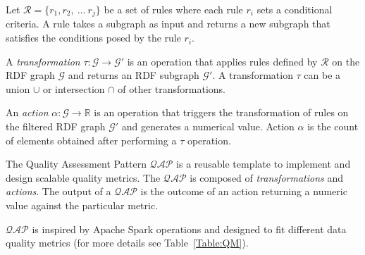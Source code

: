 \begin{definition}[Rule]
Let $\mathcal{R} = \{r_1,r_2,~\dots~r_j\}$ be a set of rules where each rule $r_i$ sets a conditional criteria. A rule takes a subgraph as input and returns a new subgraph that satisfies the conditions posed by the rule $r_i$.
\end{definition}

\begin{definition}[Transformation]
\label{def:tr}
A \textit{transformation} $\tau:\mathcal{G} \rightarrow \mathcal{G'}$ is an operation that applies rules defined by $\mathcal{R}$ on the RDF graph $\mathcal{G}$ and returns an RDF subgraph $\mathcal{G'}$. 
A transformation $\tau$ can be a union $\cup$ or intersection $\cap$ of other transformations. 
\end{definition}

\begin{definition}[Action]
\label{def:ac}
An \textit{action} $ \alpha: \mathcal{G}\rightarrow \mathbb{R}$ is an operation that triggers the transformation of rules on the filtered RDF graph $\mathcal{G'}$ and generates a numerical value. 
Action $\alpha$ is the count of elements obtained after performing a $\tau$ operation.
\end{definition}

\begin{definition}
\label{def:QAP}
The Quality Assessment Pattern $\mathcal{QAP}$ is a reusable template to implement and design scalable quality metrics. %
The $\mathcal{QAP}$ is composed of \textit{transformations} and \textit{actions}. 
The output of a $\mathcal{QAP}$ is the outcome of an action returning a numeric value against the particular metric.
\end{definition}

$\mathcal{QAP}$ is inspired by Apache Spark operations and designed to fit different data quality metrics (for more details see Table~\ref{Table:QM}). 


